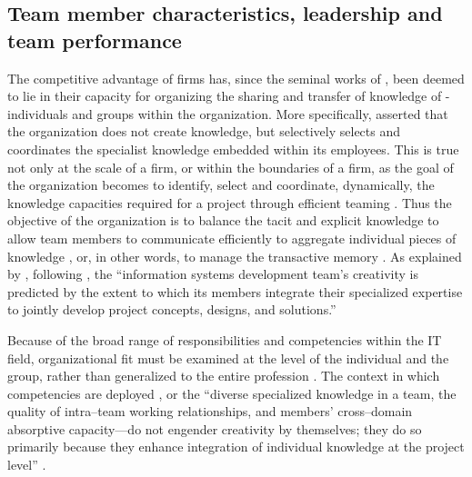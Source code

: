 \subsection{Team member characteristics, leadership and team performance}

The competitive advantage of firms has, since the seminal works of \cite{LocanderNapierScamell79,KogutZander92}, been deemed to lie in their capacity for organizing the sharing and transfer of knowledge of -individuals and groups within the organization. More specifically, \cite{Grant96} asserted that the organization does not create knowledge, but selectively selects and coordinates the specialist knowledge embedded within its employees. This is true not only at the scale of a firm, or within the boundaries of a firm, as the goal of the organization becomes to identify, select and coordinate, dynamically, the knowledge capacities required for a project \citep{Teeceal97} through efficient teaming \citep{WuchtyJonesUzzi07}. Thus the objective of the organization is to balance the tacit and explicit knowledge to allow team members to communicate efficiently \citep{Nonaka94} to aggregate individual pieces of knowledge \citep{Grant96}, or, in other words, to manage the transactive memory \citep{Wegner87}. As explained by \cite{TiwanaMcLean05}, following \cite{Grant96}, the ``information systems development team's creativity is predicted by the extent to which its members integrate their specialized expertise to jointly develop project concepts, designs, and solutions.''

Because of the broad range of responsibilities and competencies within the IT field, organizational fit must be examined at the level of the individual and the group, rather than generalized to the entire profession \citep{wingreen:2017:professionals}. The context in which competencies are deployed \citep{bassellier:2001:information}, or the ``diverse specialized knowledge in a team, the quality of intra--team working relationships, and  members' cross--domain absorptive capacity---do not engender creativity by themselves; they do so primarily because they enhance integration of individual knowledge at the project level'' \citep{TiwanaMcLean05}. 

